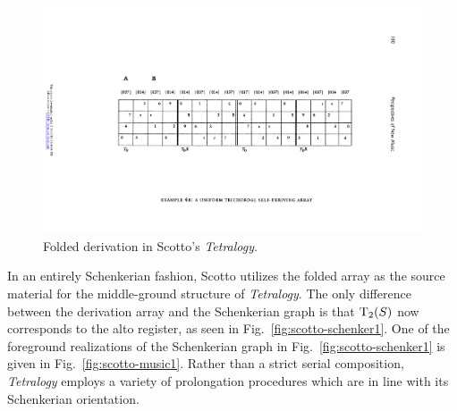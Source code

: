 \begin{example}
	\begin{figure}[H]
    	\centering
		\includegraphics[width=6.5in]{figures/scotto-folded.pdf}
		\caption[Folded derivation in Scotto's \emph{Tetralogy}]{Folded derivation in Scotto's \emph{Tetralogy}.}
    	\label{fig:scotto-folded}
	\end{figure}
	\noindent In an entirely Schenkerian fashion, Scotto utilizes the folded array as the source material for the middle-ground structure of \emph{Tetralogy}. The only difference between the derivation array and the Schenkerian graph is that $\operatorname{T}_2(S)$ now corresponds to the alto register, as seen in Fig.~\ref{fig:scotto-schenker1}. One of the foreground realizations of the Schenkerian graph in Fig.~\ref{fig:scotto-schenker1} is given in Fig.~\ref{fig:scotto-music1}. Rather than a strict serial composition, \emph{Tetralogy} employs a variety of prolongation procedures which are in line with its Schenkerian orientation.
	\begin{figure}[H]
    	\centering

\end{figure}
\end{example}
